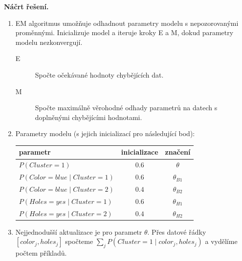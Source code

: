 \medskip
\noindent\textbf{Náčrt řešení.}\par
\begin{enumerate}
  \item EM algoritmus umožňuje odhadnout parametry modelu s nepozorovanými proměnnými. Inicializuje model a iteruje
    kroky E a M, dokud parametry modelu nezkonvergují.
    \begin{description}
      \item[E] Spočte očekávané hodnoty chybějících dat.
      \item[M] Spočte maximálně věrohodné odhady parametrů na datech s doplněnými chybějícími hodnotami.
    \end{description}
  \item Parametry modelu (s jejich inicializací pro následující bod):
    \begin{center}
    \begin{tabular}{l c | c}
    \toprule
    parametr & inicializace & značení \\
    \midrule
    $P(\mathit{Cluster}=1)$ & $0{.}6$ & $\theta$ \\
    $P(\mathit{Color}=\mathit{blue} \mid \mathit{Cluster}=1)$ & $0{.}6$ & $\theta_{B1}$ \\
    $P(\mathit{Color}=\mathit{blue} \mid \mathit{Cluster}=2)$ & $0{.}4$ & $\theta_{B2}$ \\
    $P(\mathit{Holes}=\mathit{yes} \mid \mathit{Cluster}=1)$ & $0{.}6$ & $\theta_{H1}$ \\
    $P(\mathit{Holes}=\mathit{yes} \mid \mathit{Cluster}=2)$ & $0{.}4$ & $\theta_{H2}$ \\
    \bottomrule
    \end{tabular}
    \end{center}
  \item Nejjednodušší aktualizace je pro parametr $\theta$. Přes datové řádky $[\mathit{color}_j, \mathit{holes}_j]$ spočteme $\sum_j P(\mathit{Cluster}=1 \mid \mathit{color}_j, \mathit{holes}_j)$
    a vydělíme počtem příkladů.
    \begin{center}
    \renewcommand{\arraystretch}{2.2}
\end{center}
\end{enumerate}
